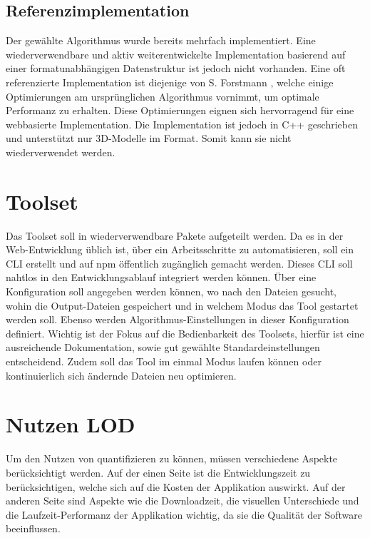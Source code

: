 \subsection{Referenzimplementation}
Der gewählte Algorithmus wurde bereits mehrfach implementiert. Eine wiederverwendbare und aktiv weiterentwickelte Implementation basierend auf einer formatunabhängigen Datenstruktur ist jedoch nicht vorhanden. Eine oft referenzierte Implementation ist diejenige von S. Forstmann \cite{fastQuadricMeshSimplification}, welche einige Optimierungen am ursprünglichen Algorithmus vornimmt, um optimale Performanz zu erhalten. Diese Optimierungen eignen sich hervorragend für eine webbasierte Implementation. Die Implementation ist jedoch in C++ geschrieben und unterstützt nur 3D-Modelle im  Format. Somit kann sie nicht wiederverwendet werden.

\section{Toolset}
Das Toolset soll in wiederverwendbare Pakete aufgeteilt werden.
Da es in der Web-Entwicklung üblich ist, über ein  Arbeitsschritte zu automatisieren, soll ein \gls{CLI} erstellt und auf \gls{npm} öffentlich zugänglich gemacht werden. Dieses \gls{CLI} soll nahtlos in den Entwicklungsablauf integriert werden können. Über eine Konfiguration soll angegeben werden können, wo nach den  Dateien gesucht, wohin die Output-Dateien gespeichert und in welchem Modus das Tool gestartet werden soll. Ebenso werden Algorithmus-Einstellungen in dieser Konfiguration definiert. Wichtig ist der Fokus auf die Bedienbarkeit des Toolsets, hierfür ist eine ausreichende Dokumentation, sowie gut gewählte Standardeinstellungen entscheidend. Zudem soll das Tool im einmal Modus laufen können oder kontinuierlich sich ändernde Dateien neu optimieren.

\section{Nutzen LOD}
Um den Nutzen von  quantifizieren zu können, müssen verschiedene Aspekte berücksichtigt werden. Auf der einen Seite ist die Entwicklungszeit zu berücksichtigen, welche sich auf die Kosten der Applikation auswirkt. Auf der anderen Seite sind Aspekte wie die Downloadzeit, die visuellen Unterschiede und die Laufzeit-Performanz der Applikation wichtig, da sie die Qualität der Software beeinflussen.

